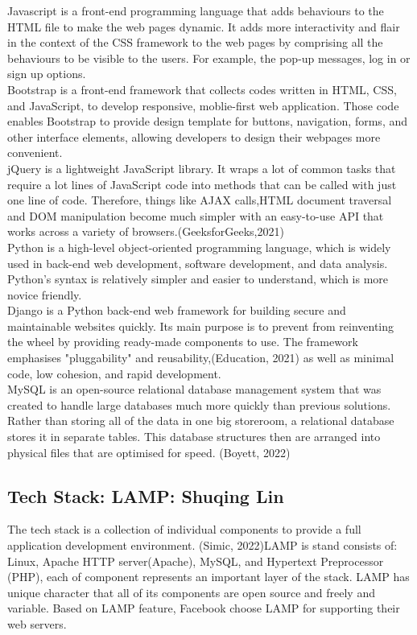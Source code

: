 \documentclass[a4paper, 11pt]{report}
\begin{document}
\noindent Javascript is a front-end programming language that adds behaviours to the HTML file to make the web pages dynamic. It adds more interactivity and flair in the context of the CSS framework to the web pages by comprising all the behaviours to be visible to the users. For example, the pop-up messages, log in or sign up options.\\

\noindent Bootstrap is a front-end framework that collects codes written in HTML, CSS, and JavaScript, to develop responsive, moblie-first web application. Those code enables Bootstrap to provide design template for buttons, navigation, forms, and other interface elements, allowing developers to design their webpages more convenient.\\

\noindent jQuery is a lightweight JavaScript library. It wraps a lot of common tasks that require a lot lines of JavaScript code into methods that can be called with just one line of code. Therefore, things like AJAX calls,HTML document traversal and DOM manipulation become much simpler with an easy-to-use API that works across a variety of browsers.(GeeksforGeeks,2021)\\

\noindent Python is a high-level object-oriented programming language, which is widely used in back-end web development, software development, and data analysis. Python's syntax is relatively simpler and easier to understand, which is more novice friendly.\\

\noindent Django is a  Python back-end web framework for building secure and maintainable websites quickly. Its main purpose is to prevent from reinventing the wheel by providing ready-made components to use. The framework emphasises "pluggability" and reusability,(Education, 2021) as well as minimal code, low cohesion, and rapid development. \\

\noindent MySQL is an open-source relational database management system that was created to handle large databases much more quickly than previous solutions. Rather than storing all of the data in one big storeroom, a relational database stores it in separate tables. This database structures then are arranged into physical files that are optimised for speed. (Boyett, 2022)\\

\subsection{Tech Stack: LAMP: Shuqing Lin}
\noindent The tech stack is a collection of individual components to provide a full application development environment. (Simic, 2022)LAMP is stand consists of: Linux, Apache HTTP server(Apache), MySQL, and Hypertext Preprocessor (PHP), each of component represents an important layer of the stack. LAMP has unique character that all of its components are open source and freely and variable.  Based on LAMP feature, Facebook choose LAMP for supporting their web servers.\\
\end{document}
